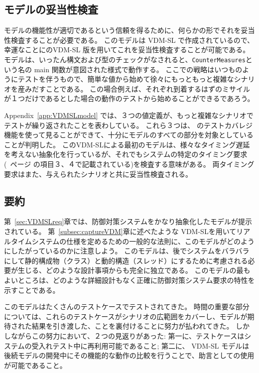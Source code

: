 \documentclass[\pformat,12pt]{jreport}
\begin{document}
\subsection{モデルの妥当性検査}

モデルの機能性が適切であるという信頼を得るために、何らかの形でそれを妥当性検査することが必要である。
このモデルは VDM-SL で作成されているので、幸運なことに\VDMTools のVDM-SL 版を用いてこれを妥当性検査することが可能である。
モデルは、いったん構文および型のチェックがなされると、\texttt{CounterMeasures}という名の main 関数が意図された様式で動作する。
ここでの戦略はいつものようにテストを伴うもので、簡単な値から始めて徐々にもっともっと複雑なシナリオを産みだすことである。
この場合例えば、それぞれ到着するはずのミサイルが１つだけであるとした場合の動作のテストから始めることができるであろう。

Appendix~\ref{app:VDMSLmodel} では、３つの値定義が、もっと複雑なシナリオでテストが繰り返されたことを表わしている。
これら３つは、 \VDMTools のテストカバレジ機能を使って見ることができて、十分にモデルのすべての部分を対象としていることが判明した。
このVDM-SLによる最初のモデルは、様々なタイミング遅延を考えない抽象化を行っているが、それでもシステムの特定のタイミング要求(~\pageref{timereq34}ページ の項目３、４で記載されている)を検査する意味がある。
両タイミング要求はまた、与えられたシナリオと共に妥当性検査される。

\subsection{要約}

第~\ref{sec:VDMSLreq}章では、防御対策システムをかなり抽象化したモデルが提示されている。
第~\ref{subsec:captureVDM}章に述べたような VDM-SLを用いてリアルタイムシステムの仕様を定めるための一般的な法則に、このモデルがどのようにしたがっているのかに注意しよう。
このモデルは、後でシステムをバラバラにして静的構成物（クラス）と動的構造（スレッド）にするために考慮される必要が生じる、どのような設計事項からも完全に独立である。
このモデルの最もよいところは、どのような詳細設計もなく正確に防御対策システム要求の特性を示すことである。

このモデルはたくさんのテストケースでテストされてきた。
時間の重要な部分については、これらのテストケースがシナリオの広範囲をカバーし、モデルが期待された結果を引き渡した、ことを裏付けることに努力が払われてきた。
しかしながらこの努力において、２つの見返りがあった: 第一に、テストケースはシステムの受入れテスト中に再利用可能であること; 第二に、 VDM-SL モデルは後続モデルの開発中にその機能的な動作の比較を行うことで、助言としての使用が可能であること。
\end{document}
